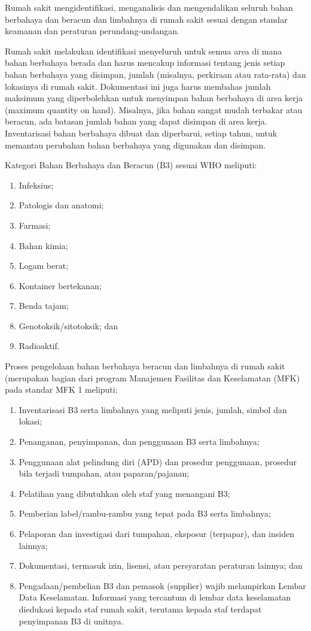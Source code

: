 \documentclass[
]{book}
\providecommand{\tightlist}{%
  \setlength{\itemsep}{0pt}\setlength{\parskip}{0pt}}
\begin{document}
Rumah sakit mengidentifikasi, menganalisis dan mengendalikan seluruh bahan berbahaya dan beracun dan limbahnya di rumah sakit sesuai dengan standar keamanan dan peraturan perundang-undangan.

Rumah sakit melakukan identifikasi menyeluruh untuk semua area di mana bahan berbahaya berada dan harus mencakup informasi tentang jenis setiap bahan berbahaya yang disimpan, jumlah (misalnya, perkiraan atau rata-rata) dan lokasinya di rumah sakit. Dokumentasi ini juga harus membahas jumlah maksimum yang diperbolehkan untuk menyimpan bahan berbahaya di area kerja (maximum quantity on hand). Misalnya, jika bahan sangat mudah terbakar atau beracun, ada batasan jumlah bahan yang dapat disimpan di area kerja. Inventarisasi bahan berbahaya dibuat dan diperbarui, setiap tahun, untuk memantau perubahan bahan berbahaya yang digunakan dan disimpan.

Kategori Bahan Berbahaya dan Beracun (B3) sesuai WHO meliputi:

\begin{enumerate}
\def\labelenumi{\alph{enumi}.}
\tightlist
\item
  Infeksius;
\item
  Patologis dan anatomi;
\item
  Farmasi;
\item
  Bahan kimia;
\item
  Logam berat;
\item
  Kontainer bertekanan;
\item
  Benda tajam;
\item
  Genotoksik/sitotoksik; dan
\item
  Radioaktif.
\end{enumerate}

Proses pengelolaan bahan berbahaya beracun dan limbahnya di rumah sakit (merupakan bagian dari program Manajemen Fasilitas dan Keselamatan (MFK) pada standar MFK 1 meliputi:

\begin{enumerate}
\def\labelenumi{\alph{enumi}.}
\tightlist
\item
  Inventarisasi B3 serta limbahnya yang meliputi jenis, jumlah, simbol dan lokasi;
\item
  Penanganan, penyimpanan, dan penggunaan B3 serta limbahnya;
\item
  Penggunaan alat pelindung diri (APD) dan prosedur penggunaan, prosedur bila terjadi tumpahan, atau paparan/pajanan;
\item
  Pelatihan yang dibutuhkan oleh staf yang menangani B3;
\item
  Pemberian label/rambu-rambu yang tepat pada B3 serta limbahnya;
\item
  Pelaporan dan investigasi dari tumpahan, eksposur (terpapar), dan insiden lainnya;
\item
  Dokumentasi, termasuk izin, lisensi, atau persyaratan peraturan lainnya; dan
\item
  Pengadaan/pembelian B3 dan pemasok (supplier) wajib melampirkan Lembar Data Keselamatan. Informasi yang tercantum di lembar data keselamatan diedukasi kepada staf rumah sakit, terutama kepada staf terdapat penyimpanan B3 di unitnya.
\end{enumerate}
\end{document}
